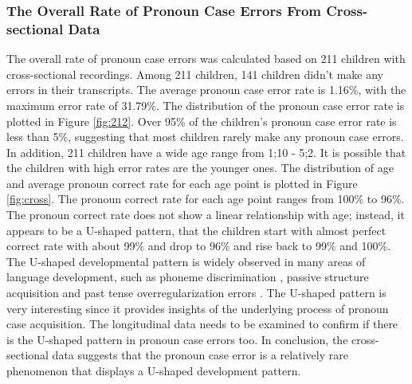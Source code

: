 \subsubsection{The Overall Rate of Pronoun Case Errors From Cross-sectional Data}
The overall rate of pronoun case errors was calculated based on 211 children with cross-sectional recordings. Among 211 children, 141 children didn't make any errors in their transcripts. The average pronoun case error rate is 1.16\%, with the maximum error rate of 31.79\%. The distribution of the pronoun case error rate is plotted in Figure \ref{fig:212}. Over 95\% of the children's pronoun case error rate is less than 5\%, suggesting that most children rarely make any pronoun case errors. In addition, 211 children have a wide age range from 1;10 - 5;2. It is possible that the children with high error rates are the younger ones. The distribution of age and average pronoun correct rate for each age point is plotted in Figure \ref{fig:cross}. The pronoun correct rate for each age point ranges from 100\% to 96\%. The pronoun correct rate does not show a linear relationship with age; instead, it appears to be a U-shaped pattern, that the children start with almost perfect correct rate with about 99\% and drop to 96\% and rise back to 99\% and 100\%. The U-shaped developmental pattern is widely observed in many areas of language development, such as phoneme discrimination \citep{werker1983developmental}, passive structure acquisition \citep{maratsos1974children} and past tense overregularization errors \citep{marcus1992overregularization, plunkett1993rote, jackson1997attention}. The U-shaped pattern is very interesting since it provides insights of the underlying process of pronoun case acquisition. The longitudinal data needs to be examined to confirm if there is the U-shaped pattern in pronoun case errors too. In conclusion, the cross-sectional data suggests that the pronoun case error is a relatively rare phenomenon that displays a U-shaped development pattern. 

